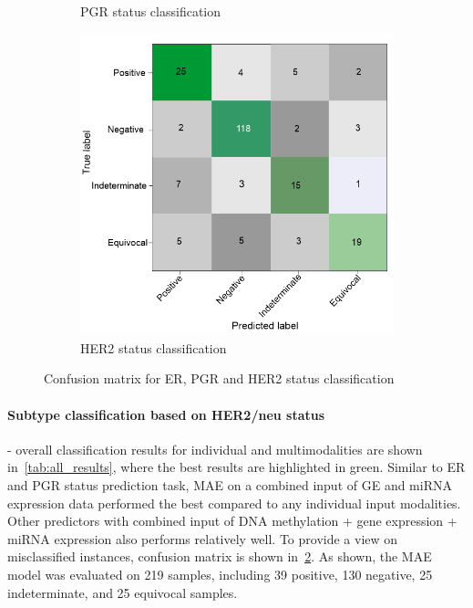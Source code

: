 \begin{figure}
\begin{subfigure}{.49\linewidth}
		\caption{PGR status classification}
        \label{fig:pgr_confusion}
	\end{subfigure}
	\begin{subfigure}{0.49\linewidth}
		\centering
		\includegraphics[scale=0.8]{images/conf_her2.png}
		\caption{HER2 status classification }
        \label{fig:her2_confusion}
	\end{subfigure}
	\caption{Confusion matrix for ER, PGR and HER2 status classification~\cite{karimACCESS2019}} 
	\label{fig:multi_cms}
\end{figure}

\paragraph{Subtype classification based on HER2/neu status} - overall classification results for individual and multimodalities are shown in~\cref{tab:all_results}, where the best results are highlighted in green. Similar to ER and PGR status prediction task, MAE on a combined input of GE and miRNA expression data performed the best compared to any individual input modalities. Other predictors with combined input of DNA methylation + gene expression + miRNA expression also performs relatively well. To provide a view on misclassified instances, confusion matrix is shown in~\cref{fig:her2_confusion}. As shown, the MAE model was evaluated on 219 samples, including 39 positive, 130 negative, 25 indeterminate, and 25 equivocal samples. 

